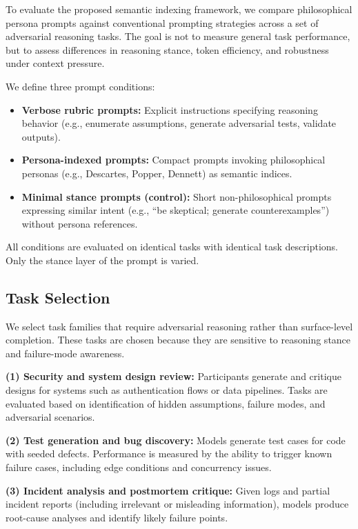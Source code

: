 \documentclass[11pt]{article}
\begin{document}
To evaluate the proposed semantic indexing framework, we compare philosophical persona prompts against conventional prompting strategies across a set of adversarial reasoning tasks. The goal is not to measure general task performance, but to assess differences in reasoning stance, token efficiency, and robustness under context pressure.

We define three prompt conditions:

\begin{itemize}
\item \textbf{Verbose rubric prompts:} Explicit instructions specifying reasoning behavior (e.g., enumerate assumptions, generate adversarial tests, validate outputs).
\item \textbf{Persona-indexed prompts:} Compact prompts invoking philosophical personas (e.g., Descartes, Popper, Dennett) as semantic indices.
\item \textbf{Minimal stance prompts (control):} Short non-philosophical prompts expressing similar intent (e.g., “be skeptical; generate counterexamples”) without persona references.
\end{itemize}

All conditions are evaluated on identical tasks with identical task descriptions. Only the stance layer of the prompt is varied.

\subsection{Task Selection}

We select task families that require adversarial reasoning rather than surface-level completion. These tasks are chosen because they are sensitive to reasoning stance and failure-mode awareness.

\textbf{(1) Security and system design review:}  
Participants generate and critique designs for systems such as authentication flows or data pipelines. Tasks are evaluated based on identification of hidden assumptions, failure modes, and adversarial scenarios.

\textbf{(2) Test generation and bug discovery:}  
Models generate test cases for code with seeded defects. Performance is measured by the ability to trigger known failure cases, including edge conditions and concurrency issues.

\textbf{(3) Incident analysis and postmortem critique:}  
Given logs and partial incident reports (including irrelevant or misleading information), models produce root-cause analyses and identify likely failure points.
\end{document}
